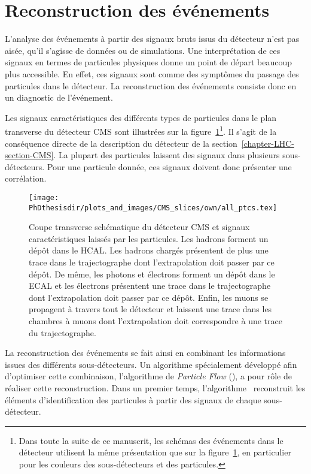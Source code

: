 \section{Reconstruction des événements}\label{chapter-LHC-section-evt_reco}
L'analyse des événements à partir des signaux bruts issus du détecteur n'est pas aisée, qu'il s'agisse de données ou de simulations.
Une interprétation de ces signaux en termes de particules physiques donne un point de départ beaucoup plus accessible.
En effet, ces signaux sont comme des \og symptômes \fg{} du passage des particules dans le détecteur.
La reconstruction des événements consiste donc en un \og diagnostic \fg{} de l'événement.
\par Les signaux caractéristiques des différents types de particules dans le plan transverse du détecteur CMS sont illustrées sur la figure~\ref{fig-chapter-LHC-section-evt_reco-cms_slice}\footnote{Dans toute la suite de ce manuscrit, les schémas des événements dans le détecteur utilisent la même présentation que sur la figure~\ref{fig-chapter-LHC-section-evt_reco-cms_slice}, en particulier pour les couleurs des sous-détecteurs et des particules.}.
Il s'agit de la conséquence directe de la description du détecteur de la section~\ref{chapter-LHC-section-CMS}.
La plupart des particules laissent des signaux dans plusieurs sous-détecteurs.
Pour une particule donnée, ces signaux doivent donc présenter une corrélation.
\begin{figure}[h]
\texttt{[image: \\PhDthesisdir/plots\_and\_images/CMS\_slices/own/all\_ptcs.tex]}
\caption[Coupe transverse schématique du détecteur CMS.]{Coupe transverse schématique du détecteur CMS et signaux caractéristiques laissés par les particules. Les hadrons forment un dépôt dans le HCAL. Les hadrons chargés présentent de plus une trace dans le trajectographe dont l'extrapolation doit passer par ce dépôt. De même, les photons et électrons forment un dépôt dans le ECAL et les électrons présentent une trace dans le trajectographe dont l'extrapolation doit passer par ce dépôt. Enfin, les muons se propagent à travers tout le détecteur et laissent une trace dans les chambres à muons dont l'extrapolation doit correspondre à une trace du trajectographe.}
\label{fig-chapter-LHC-section-evt_reco-cms_slice}
\end{figure}
\par La reconstruction des événements se fait ainsi en combinant les informations issues des différents sous-détecteurs.
Un algorithme spécialement développé afin d'optimiser cette combinaison, l'algorithme de \emph{Particle Flow} (\PF), a pour rôle de réaliser cette reconstruction. Dans un premier temps, l'algorithme \PF\ reconstruit les éléments d'identification des particules à partir des signaux de chaque sous-détecteur.
